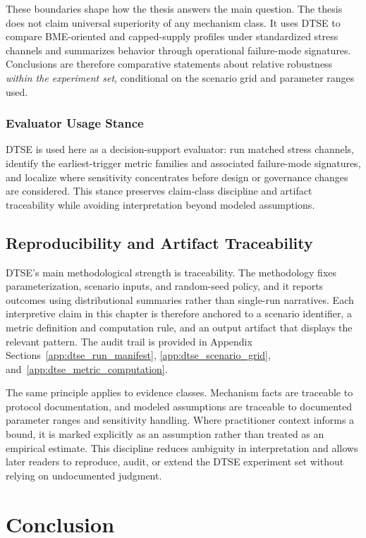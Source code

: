 These boundaries shape how the thesis answers the main question. The thesis does not claim universal superiority of any mechanism class. It uses DTSE to compare BME-oriented and capped-supply profiles under standardized stress channels and summarizes behavior through operational failure-mode signatures. Conclusions are therefore comparative statements about relative robustness \emph{within the experiment set}, conditional on the scenario grid and parameter ranges used.

\subsubsection*{Evaluator Usage Stance}
DTSE is used here as a decision-support evaluator: run matched stress channels, identify the earliest-trigger metric families and associated failure-mode signatures, and localize where sensitivity concentrates before design or governance changes are considered. This stance preserves claim-class discipline and artifact traceability while avoiding interpretation beyond modeled assumptions.

\subsection{Reproducibility and Artifact Traceability}
DTSE's main methodological strength is traceability. The methodology fixes parameterization, scenario inputs, and random-seed policy, and it reports outcomes using distributional summaries rather than single-run narratives. Each interpretive claim in this chapter is therefore anchored to a scenario identifier, a metric definition and computation rule, and an output artifact that displays the relevant pattern. The audit trail is provided in Appendix Sections~\ref{app:dtse_run_manifest}, \ref{app:dtse_scenario_grid}, and~\ref{app:dtse_metric_computation}.

The same principle applies to evidence classes. Mechanism facts are traceable to protocol documentation, and modeled assumptions are traceable to documented parameter ranges and sensitivity handling. Where practitioner context informs a bound, it is marked explicitly as an assumption rather than treated as an empirical estimate. This discipline reduces ambiguity in interpretation and allows later readers to reproduce, audit, or extend the DTSE experiment set without relying on undocumented judgment.

\section{Conclusion}
\label{sec:conclusion}

